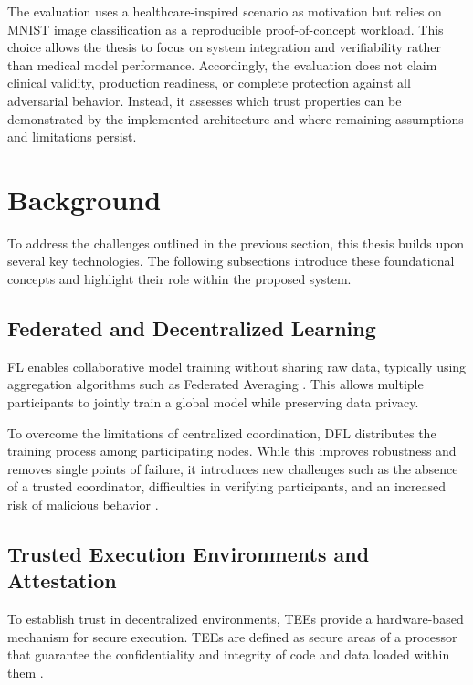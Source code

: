 The evaluation uses a healthcare-inspired scenario as motivation but relies on MNIST image classification as a reproducible proof-of-concept workload. This choice allows the thesis to focus on system integration and verifiability rather than medical model performance. Accordingly, the evaluation does not claim clinical validity, production readiness, or complete protection against all adversarial behavior. Instead, it assesses which trust properties can be demonstrated by the implemented architecture and where remaining assumptions and limitations persist.



\section{Background}

To address the challenges outlined in the previous section, this thesis builds upon several key technologies. The following subsections introduce these foundational concepts and highlight their role within the proposed system.

\subsection{Federated and Decentralized Learning}

\ac{FL} enables collaborative model training without sharing raw data, typically using aggregation algorithms such as Federated Averaging \cite{mcmahan2017communication}. This allows multiple participants to jointly train a global model while preserving data privacy.

To overcome the limitations of centralized coordination, \ac{DFL} distributes the training process among participating nodes. While this improves robustness and removes single points of failure, it introduces new challenges such as the absence of a trusted coordinator, difficulties in verifying participants, and an increased risk of malicious behavior \cite{Kalapaaking_2023}.

\subsection{Trusted Execution Environments and Attestation}

To establish trust in decentralized environments, \acp{TEE} provide a hardware-based mechanism for secure execution. \acp{TEE} are defined as secure areas of a processor that guarantee the confidentiality and integrity of code and data loaded within them \cite{sabt2015trusted}.

